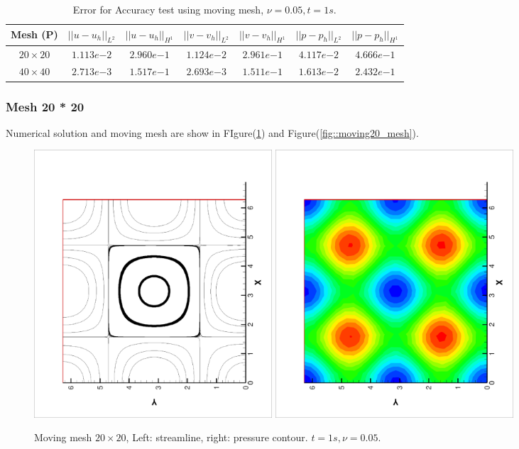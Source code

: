 \documentclass{article}
\begin{document}
\begin{table}[!htbp]
  \centering
  \begin{tabular}{ccccccc} \toprule
    Mesh (P)  & $||u - u_h ||_{L^2}$ & $||u - u_h ||_{H^1}$ & $||v -
    v_h||_{L^2}$ & $||v - v_h||_{H^1}$ & $||p - p_h||_{L^2}$ & $||p -
    p_h||_{H^1}$ \\ \midrule
    $20 \times 20$ &   $1.113 e{-2}$    & $2.960 e{-1}$ &
    $1.124 e{-2}$   &$2.961 e{-1}$   &   $4.117 
    e{-2}$ &   $4.666  e{-1}$ \\ \midrule
    $40 \times 40$   &   $2.713 e{-3}$   &   $1.517 e{-1}$  &
    $2.693   e{-3}$ & $1.511   e{-1}$ &
    $1.613   e{-2}$ & $2.432   e{-1}$ \\ \bottomrule
  \end{tabular}
  \caption{\small Error for Accuracy test using moving mesh, $\nu = 0.05, t = 1s$.}
  \label{tab::accuracy_moving_error}
\end{table}
  
  \subsubsection{Mesh 20 * 20}

 Numerical solution and moving mesh are show in
 FIgure(\ref{fig::moving20_solution}) and Figure(\ref{fig::moving20_mesh}).

 \begin{figure}[ht]
   \centering
   \includegraphics[width = 0.43\textwidth, angle = -90]{./moving20_streamline.eps}
   \includegraphics[width = 0.43\textwidth, angle = -90]{./moving20_pressure.eps}
   \caption{\small Moving mesh $20 \times 20$, Left: streamline, right: pressure
     contour. $t = 1s, \nu = 0.05$.}
   \label{fig::moving20_solution}
 \end{figure}
\end{document}
